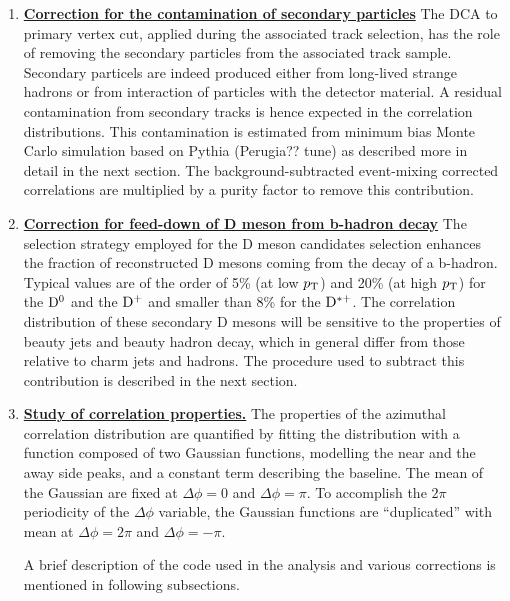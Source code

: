 \begin{enumerate}
\item
\underline {\bf Correction for the contamination of secondary particles}
The DCA to primary vertex cut, applied during the associated track selection, has the role of removing the secondary particles from the associated track sample.
Secondary particels are indeed produced either from long-lived strange hadrons or from interaction of particles with the detector material. A residual contamination from secondary tracks is hence expected in the correlation distributions. This contamination is estimated from minimum bias Monte Carlo simulation
based on Pythia (Perugia?? tune) as described more in detail in the next section. The background-subtracted
event-mixing corrected correlations are multiplied by a purity factor to remove this contribution.
\item
\underline {\bf Correction for feed-down of D meson from b-hadron decay}
The selection strategy employed for the D meson candidates selection %
enhances the fraction of reconstructed D mesons coming from the decay of a b-hadron. Typical values
are of the order of 5\% (at low $p_{\rm T}$) and 20\% (at high $p_{\rm T}$) for the ${\rm D^0}$ and the ${\rm D^+}$ and smaller
than 8\% for the ${\rm D^{*+}}$. The correlation distribution of these secondary D mesons will be sensitive to
the properties of beauty jets and beauty hadron decay, which in general differ from those
relative to charm jets and hadrons. The procedure used to subtract this contribution is described in the next section.

\item
\underline{\bf Study of correlation properties.}
The properties of the azimuthal correlation distribution are quantified by
fitting the distribution with a function composed of two Gaussian functions, modelling the near and the away side peaks, and
a constant term describing the baseline. The mean of the Gaussian are fixed at
$\Delta\phi = 0$ and $\Delta\phi = \pi$. To accomplish the $2\pi$ periodicity
of the $\Delta\phi$ variable, the Gaussian functions
are ``duplicated'' with mean at $\Delta\phi = 2\pi$ and $\Delta\phi = -\pi$.  %

A brief description of the code used in the analysis and various
corrections is mentioned in following subsections.
\end{enumerate}

